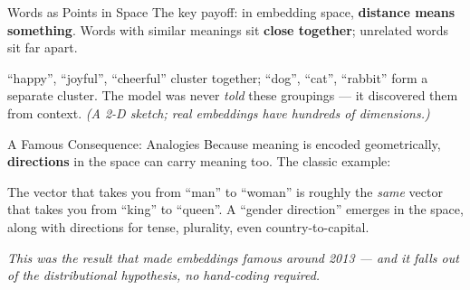 \documentclass[aspectratio=169]{beamer}
\begin{document}
\begin{frame}{Words as Points in Space}
\vspace{0.1cm}
{\small The key payoff: in embedding space, \textbf{distance means something}. Words with
similar meanings sit \textbf{close together}; unrelated words sit far apart.}

\smallskip
\begin{center}
\end{center}

\smallskip
{\small ``happy'', ``joyful'', ``cheerful'' cluster together; ``dog'', ``cat'', ``rabbit''
form a separate cluster. The model was never \emph{told} these groupings --- it discovered
them from context. \textcolor{midgray}{\textit{(A 2-D sketch; real embeddings have hundreds
of dimensions.)}}}
\end{frame}

\begin{frame}{A Famous Consequence: Analogies}
\vspace{0.2cm}
{\small Because meaning is encoded geometrically, \textbf{directions} in the space can carry
meaning too. The classic example:}

\bigskip
\begin{center}
\end{center}

\bigskip
{\small The vector that takes you from ``man'' to ``woman'' is roughly the \emph{same} vector
that takes you from ``king'' to ``queen''. A ``gender direction'' emerges in the space, along
with directions for tense, plurality, even country-to-capital.}

\medskip
{\small\textcolor{midgray}{\textit{This was the result that made embeddings famous around 2013
--- and it falls out of the distributional hypothesis, no hand-coding required.}}}
\end{frame}
\end{document}
